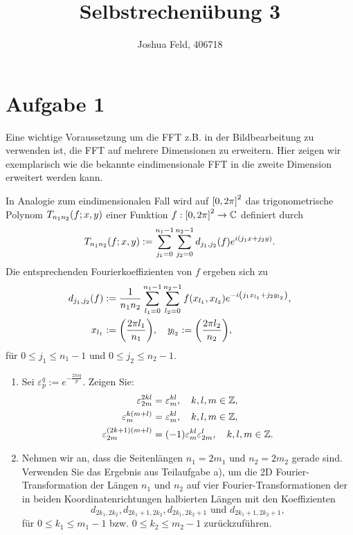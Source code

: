 \documentclass{exercise}
\institute{Applied and Computational Mathematics}
\title{Selbstrechenübung 3}
\author{Joshua Feld, 406718}
\begin{document}
    \maketitle


    \section*{Aufgabe 1}

    \begin{problem}
        Eine wichtige Voraussetzung um die FFT z.B. in der Bildbearbeitung zu verwenden ist, die FFT auf mehrere Dimensionen zu erweitern.
        Hier zeigen wir exemplarisch wie die bekannte eindimensionale FFT in die zweite Dimension erweitert werden kann.

        In Analogie zum eindimensionalen Fall wird auf \(\brackets*{0, 2\pi}^2\) das trigonometrische Polynom \(T_{n_1 n_2}\parentheses*{f; x, y}\) einer Funktion \(f: \brackets*{0, 2\pi}^2 \to \C\) definiert durch
        \[
            T_{n_1 n_2}\parentheses*{f; x, y} := \sum_{j_1 = 0}^{n_1 - 1}\sum_{j_2 = 0}^{n_2 - 1}d_{j_1, j_2}\parentheses*{f}e^{i\parentheses*{j_1 x + j_2 y}}.
        \]
        Die entsprechenden Fourierkoeffizienten von \(f\) ergeben sich zu
        \begin{align*}
            d_{j_1, j_2}\parentheses*{f} &:= \frac{1}{n_1 n_2}\sum_{l_1 = 0}^{n_1 - 1}\sum_{l_2 = 0}^{n_2 - 1}f\parentheses*{x_{l_1}, x_{l_2}}e^{-i\parentheses*{j_1 x_{l_1} + j_2 y_{l_2}}},\\
            x_{l_1} &:= \parentheses*{\frac{2\pi l_1}{n_1}}, \quad y_{l_2} := \parentheses*{\frac{2\pi l_2}{n_2}},
        \end{align*}
        für \(0 \le j_1 \le n_1 - 1\) und \(0 \le j_2 \le n_2 - 1\).
        \begin{enumerate}
            \item Sei \(\varepsilon_p^q := e^{-\frac{2\pi iq}{p}}\).
            Zeigen Sie:
            \begin{align*}
                \varepsilon_{2m}^{2kl} &= \varepsilon_m^{kl}, \quad k, l, m \in \Z,\\
                \varepsilon_m^{k\parentheses*{m + l}} &= \varepsilon_m^{kl}, \quad k, l, m \in \Z,\\
                \varepsilon_{2m}^{\parentheses*{2k + 1}\parentheses*{m + l}} &= \parentheses*{-1}\varepsilon_m^{kl}\varepsilon_{2m}^l, \quad k, l, m \in \Z.
            \end{align*}
            \item Nehmen wir an, dass die Seitenlängen \(n_1 = 2m_1\) und \(n_2 = 2m_2\) gerade sind.
            Verwenden Sie das Ergebnis aus Teilaufgabe a), um die 2D Fourier-Transformation der Längen \(n_1\) und \(n_2\) auf vier Fourier-Transformationen der in beiden Koordinatenrichtungen halbierten Längen mit den Koeffizienten
            \[
                d_{2k_1, 2k_2}, d_{2k_1 + 1, 2k_2}, d_{2k_1, 2k_2 + 1}\text{ und }d_{2k_1 + 1, 2k_2 + 1},
            \]
            für \(0 \le k_1 \le m_1 - 1\) bzw. \(0 \le k_2 \le m_2 - 1\) zurückzuführen.
        \end{enumerate}
    \end{problem}
\end{document}
